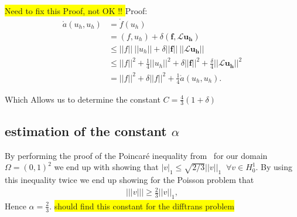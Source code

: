 \colorbox{yellow}{Need to fix this Proof, not OK !! }
Proof:
\begin{align}
	\mathring{a}(u_h,u_h) &= \mathring{f}(u_h) \\
	&= (f,u_h) + \delta(\mathbf{f},\mathcal{L}\mathbf{u_h}) \\
	&\leq ||f||\:||u_h||+\delta||\mathbf{f}||\:||\mathcal{L}\mathbf{u_h}|| \\
	&\leq ||f||^2 + \frac{1}{4}||u_h||^2 + \delta||\mathbf{f}||^2 + \frac{\delta}{4}||\mathcal{L}\mathbf{u_h}||^2 \\
	&= ||f||^2 + \delta||f||^2 + \frac{1}{4}\mathring{a}(u_h,u_h).
	\label{eq:derivationStabilityResult}
\end{align}

Which Allows us to determine the constant $C= \frac{4}{3}(1+\delta)$






\subsection{estimation of the constant $\alpha$}

By performing the proof of the Poincar\'e inequality from~\cite{Quarteroni} for our domain $\Omega=(0,1)^2$ we end up with showing that $|v|_1\leq \sqrt{2/3}||v||_1 \;\; \forall v \in H^1_0$. By using this inequality twice we end up showing for the Poisson problem that
\begin{align}
	|||v||| \geq \frac{2}{3}||v||_1,
	\label{eq:resultAlpha}
\end{align}
Hence $\alpha=\frac{2}{3}$. \colorbox{yellow}{should find this constant for the difftrans problem}
%
